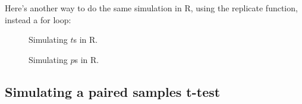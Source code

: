 \documentclass[
  letterpaper,
  DIV=11,
  numbers=noendperiod]{scrreprt}
\begin{document}
Here's another way to do the same simulation in R, using the replicate
function, instead a for loop:

\begin{figure}


\caption{\label{fig-7simtsRep}Simulating \(t\)s in R.}

\end{figure}%

\begin{figure}


\caption{\label{fig-7simpsRep}Simulating \(p\)s in R.}

\end{figure}%

\subsection{Simulating a paired samples
t-test}\label{simulating-a-paired-samples-t-test}
\end{document}
